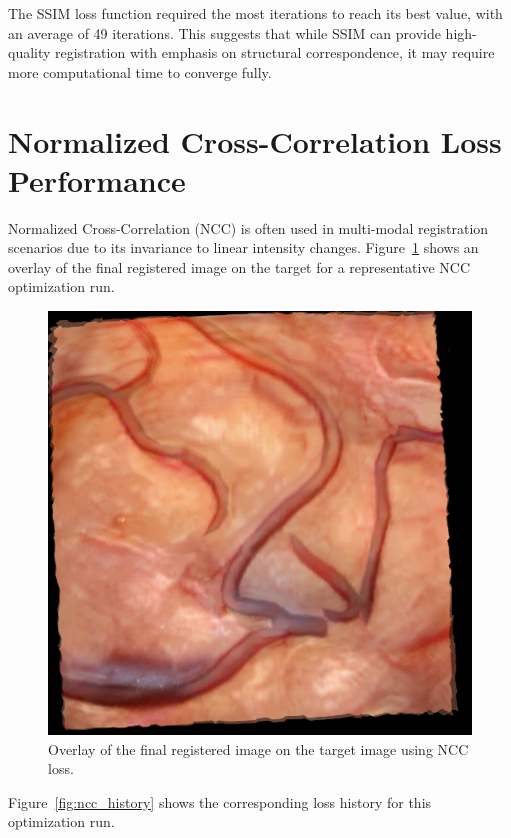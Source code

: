 The SSIM loss function required the most iterations to reach its best value, with an average of 49 iterations. This suggests that while SSIM can provide high-quality registration with emphasis on structural correspondence, it may require more computational time to converge fully.

\section{Normalized Cross-Correlation Loss Performance}

Normalized Cross-Correlation (NCC) is often used in multi-modal registration scenarios due to its invariance to linear intensity changes. Figure~\ref{fig:ncc_overlay} shows an overlay of the final registered image on the target for a representative NCC optimization run.

\begin{figure}[htpb]
  \centering
  \includegraphics[scale=0.5]{figures/ncc/alignment_overlay.png}
  \caption[Registration result with NCC loss]{Overlay of the final registered image on the target image using NCC loss.}
  \label{fig:ncc_overlay}
\end{figure}

Figure~\ref{fig:ncc_history} shows the corresponding loss history for this optimization run.


